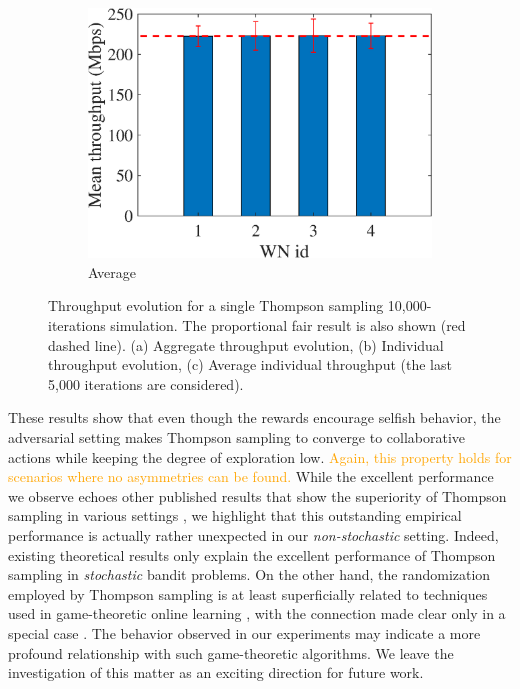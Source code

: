 \documentclass[preprint,12pt]{elsarticle}
\newcommand{\francesco}[1]{\textcolor{orange}{#1}}
\begin{document}
\begin{figure}
\begin{subfigure}[b]{.3\textwidth}
		\includegraphics[width=\textwidth]{images/NEW_mean_tpt_TS}
		\caption{Average}\label{fig:ts_avg_individual}
	\end{subfigure}
		\caption{Throughput evolution for a single Thompson sampling 10,000-iterations simulation. The proportional fair result is also shown (red dashed line). (a) Aggregate throughput evolution, (b) Individual throughput evolution, (c) Average individual throughput (the last 5,000 iterations are considered).}
		\label{fig:ts_tpt_evolution}
\end{figure}

These results show that even though the rewards encourage selfish behavior, the adversarial setting makes Thompson sampling to converge to collaborative actions while keeping the degree of exploration low. \francesco{Again, this property holds for scenarios where no asymmetries can be found.} While the excellent performance we observe echoes other published results that show the superiority of Thompson sampling in various settings \cite{LCLS10}, we highlight that this outstanding empirical performance is actually rather unexpected in our \emph{non-stochastic} setting. Indeed, existing theoretical results only explain the excellent performance of Thompson sampling in \emph{stochastic} bandit problems. On the other hand, the randomization employed by Thompson sampling is at least superficially related to techniques used in game-theoretic online learning \cite{FS97,CBLu06:book}, with the connection made clear only in a special case \cite{Gop13}. The behavior observed in our experiments may indicate a more profound relationship with such game-theoretic algorithms. We leave the investigation of this matter as an exciting direction for future work.
\end{document}
